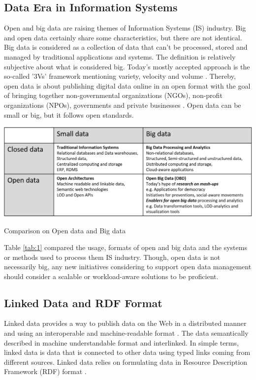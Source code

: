 \subsection{Data Era in Information Systems}
\noindent Open and big data are raising themes of Information Systems (IS) industry\cite{reframingopenbigdata}. Big and open data certainly share some characteristics, but there are not identical. Big data is considered as a collection of data that can't be processed, stored and managed by traditional applications and systems. The definition is  relatively subjective about what is considered big. Today's mostly accepted approach is the so-called '3Vs' framework mentioning variety, velocity and volume \cite{bigdataunderstanding}.  Thereby, open data is about publishing digital data online in an open format with the goal of bringing together non-governmental organizations (NGOs), non-profit organizations (NPOs), governments and private businesses \cite{reframingopenbigdata}. Open data can be small or big, but it follows open standards. 
\begin{center}
	\includegraphics[width=38em]{./Figures/openbigdata}
	\begin{table}[htbp]
    \caption{Comparison on Open data and Big data \cite{reframingopenbigdata}}
    \label{tab:1}
	\end{table}
\end{center}
\noindent Table \ref{tab:1} compared the usage, formats  of open and big data and the systems or methods used to process them IS industry. Though, open data is not necessarily big, any new initiatives considering to support open data management should consider a scalable or workload-aware solutions to be proficient. 

\subsection{Linked Data and RDF Format}
\noindent Linked data provides a way to publish data on the Web in a distributed manner and using an interoperable and machine-readable format \cite{linkeddatasofar}. The data semantically described in machine understandable format and interlinked. In simple terms, linked data is data that is connected to other data using typed links coming from different sources.  Linked data relies on formulating data in Resource Description Framework (RDF) format \cite{rdfdefinition}. 
 
